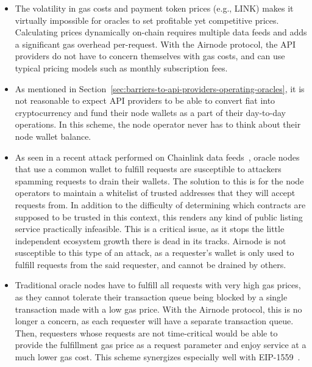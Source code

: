 \documentclass[11pt]{article}
\begin{document}
\begin{itemize}
    \item The volatility in gas costs and payment token prices (e.g., LINK) makes it virtually impossible for oracles to set profitable yet competitive prices.
    Calculating prices dynamically on-chain requires multiple data feeds and adds a significant gas overhead per-request.
    With the Airnode protocol, the API providers do not have to concern themselves with gas costs, and can use typical pricing models such as monthly subscription fees.
    \item As mentioned in Section~\ref{sec:barriers-to-api-providers-operating-oracles}, it is not reasonable to expect API providers to be able to convert fiat into cryptocurrency and fund their node wallets as a part of their day-to-day operations.
    In this scheme, the node operator never has to think about their node wallet balance.
    \item As seen in a recent attack performed on Chainlink data feeds~\cite{chainlink-gastoken}, oracle nodes that use a common wallet to fulfill requests are susceptible to attackers spamming requests to drain their wallets.
    The solution to this is for the node operators to maintain a whitelist of trusted addresses that they will accept requests from.
    In addition to the difficulty of determining which contracts are supposed to be trusted in this context, this renders any kind of public listing service practically infeasible.
    This is a critical issue, as it stops the little independent ecosystem growth there is dead in its tracks.
    Airnode is not susceptible to this type of an attack, as a requester's wallet is only used to fulfill requests from the said requester, and cannot be drained by others.
    \item Traditional oracle nodes have to fulfill all requests with very high gas prices, as they cannot tolerate their transaction queue being blocked by a single transaction made with a low gas price.
    With the Airnode protocol, this is no longer a concern, as each requester will have a separate transaction queue.
    Then, requesters whose requests are not time-critical would be able to provide the fulfillment gas price as a request parameter and enjoy service at a much lower gas cost.
    This scheme synergizes especially well with EIP-1559~\cite{eip1559}.
\end{itemize}
\end{document}
